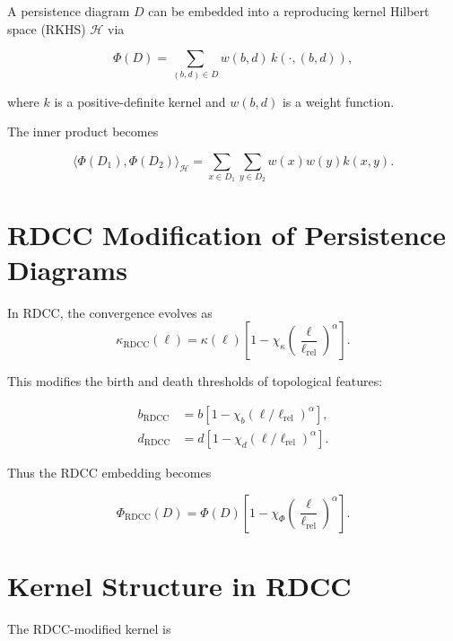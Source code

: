 \documentclass[11pt,a4paper]{article}
\begin{document}
A persistence diagram $D$ can be embedded into a reproducing kernel Hilbert space 
(RKHS) $\mathcal{H}$ via

\begin{equation}
    \Phi(D)
    = \sum_{(b,d) \in D}
      w(b,d) \, k(\cdot, (b,d)),
\end{equation}

where $k$ is a positive-definite kernel and $w(b,d)$ is a weight function.

The inner product becomes

\begin{equation}
    \langle \Phi(D_{1}), \Phi(D_{2}) \rangle_{\mathcal{H}}
    = \sum_{x \in D_{1}}
      \sum_{y \in D_{2}}
      w(x) w(y) k(x,y).
\end{equation}
\section{RDCC Modification of Persistence Diagrams}

In RDCC, the convergence evolves as
\begin{equation}
    \kappa_{\mathrm{RDCC}}(\ell)
    = \kappa(\ell)
      \left[
        1 - \chi_{\kappa}
        \left(\frac{\ell}{\ell_{\mathrm{rel}}}\right)^{\alpha}
      \right].
\end{equation}

This modifies the birth and death thresholds of topological features:

\begin{align}
    b_{\mathrm{RDCC}} &= b \left[ 1 - \chi_{b} (\ell/\ell_{\mathrm{rel}})^{\alpha} \right], \\
    d_{\mathrm{RDCC}} &= d \left[ 1 - \chi_{d} (\ell/\ell_{\mathrm{rel}})^{\alpha} \right].
\end{align}

Thus the RDCC embedding becomes

\begin{equation}
    \Phi_{\mathrm{RDCC}}(D)
    = \Phi(D)
      \left[
        1 - \chi_{\Phi}
        \left(\frac{\ell}{\ell_{\mathrm{rel}}}\right)^{\alpha}
      \right].
\end{equation}
\section{Kernel Structure in RDCC}

The RDCC-modified kernel is
\end{document}
